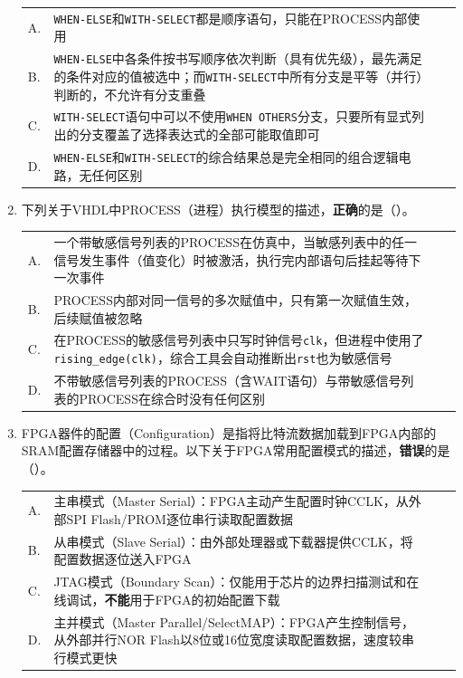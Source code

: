 \begin{enumerate}[label=\arabic*.]
\vspace{0.3cm}

\begin{tabular}{@{}lp{}@{\qquad}lp{}@{}}
A. & \texttt{WHEN-ELSE}和\texttt{WITH-SELECT}都是顺序语句，只能在PROCESS内部使用 \\
B. & \texttt{WHEN-ELSE}中各条件按书写顺序依次判断（具有优先级），最先满足的条件对应的值被选中；而\texttt{WITH-SELECT}中所有分支是平等（并行）判断的，不允许有分支重叠 \\
C. & \texttt{WITH-SELECT}语句中可以不使用\texttt{WHEN OTHERS}分支，只要所有显式列出的分支覆盖了选择表达式的全部可能取值即可 \\
D. & \texttt{WHEN-ELSE}和\texttt{WITH-SELECT}的综合结果总是完全相同的组合逻辑电路，无任何区别 \\
\end{tabular}

\vspace{0.8cm}

\item 下列关于VHDL中PROCESS（进程）执行模型的描述，\textbf{正确}的是（\quad）。

\vspace{0.3cm}

\begin{tabular}{@{}lp{}@{\qquad}lp{}@{}}
A. & 一个带敏感信号列表的PROCESS在仿真中，当敏感列表中的任一信号发生事件（值变化）时被激活，执行完内部语句后挂起等待下一次事件 \\
B. & PROCESS内部对同一信号的多次赋值中，只有第一次赋值生效，后续赋值被忽略 \\
C. & 在PROCESS的敏感信号列表中只写时钟信号\texttt{clk}，但进程中使用了\texttt{rising\_edge(clk)}，综合工具会自动推断出\texttt{rst}也为敏感信号 \\
D. & 不带敏感信号列表的PROCESS（含WAIT语句）与带敏感信号列表的PROCESS在综合时没有任何区别 \\
\end{tabular}

\vspace{0.8cm}

\item FPGA器件的配置（Configuration）是指将比特流数据加载到FPGA内部的SRAM配置存储器中的过程。以下关于FPGA常用配置模式的描述，\textbf{错误}的是（\quad）。

\vspace{0.3cm}

\begin{tabular}{@{}lp{}@{\qquad}lp{}@{}}
A. & 主串模式（Master Serial）：FPGA主动产生配置时钟CCLK，从外部SPI Flash/PROM逐位串行读取配置数据 \\
B. & 从串模式（Slave Serial）：由外部处理器或下载器提供CCLK，将配置数据逐位送入FPGA \\
C. & JTAG模式（Boundary Scan）：仅能用于芯片的边界扫描测试和在线调试，\textbf{不能}用于FPGA的初始配置下载 \\
D. & 主并模式（Master Parallel/SelectMAP）：FPGA产生控制信号，从外部并行NOR Flash以8位或16位宽度读取配置数据，速度较串行模式更快 \\
\end{tabular}


\end{enumerate}

